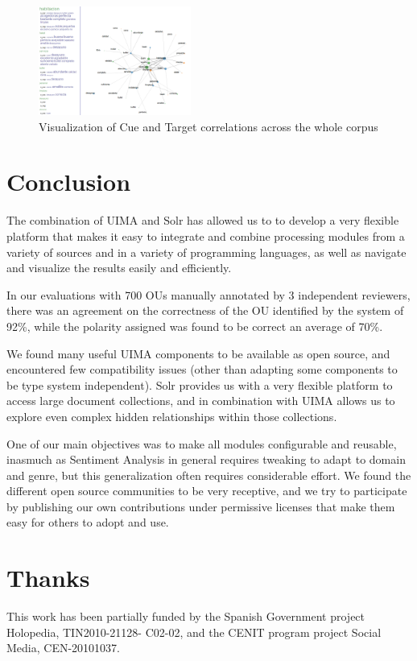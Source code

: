 \documentclass{llncs}
\begin{document}
\begin{figure}[ht!]
\centering
\includegraphics[width=5cm]{solr_visualization.png}
\caption{Visualization of Cue and Target correlations across the whole corpus} 
\label{fig:solr}
\end{figure}

\section{Conclusion}

The combination of UIMA and Solr has allowed us to to develop a very flexible platform that makes it easy to integrate and combine processing modules from a variety of sources and in a variety of programming languages, as well as navigate and visualize the results easily and efficiently.

In our evaluations with 700 OUs manually annotated by 3 independent reviewers, there was an agreement on the correctness of the OU identified by the system of 92\%, while the polarity assigned was found to be correct an average of 70\%.

We found many useful UIMA components to be available as open source, and encountered few compatibility issues (other than adapting some components to be type system independent). Solr provides us with a very flexible platform to access large document collections, and in combination with UIMA allows us to explore even complex hidden relationships within those collections.

One of our main objectives was to make all modules configurable and reusable, inasmuch as Sentiment Analysis in general requires tweaking to adapt to domain and genre, but this generalization often requires considerable effort. We found the different open source communities to be very receptive, and we try to participate by publishing our own contributions under permissive licenses that make them easy for others to adopt and use.

\section{Thanks}
This work has been partially funded by the Spanish
Government project Holopedia, TIN2010-21128-
C02-02, and the CENIT program project Social Media,
CEN-20101037.



\end{document}
